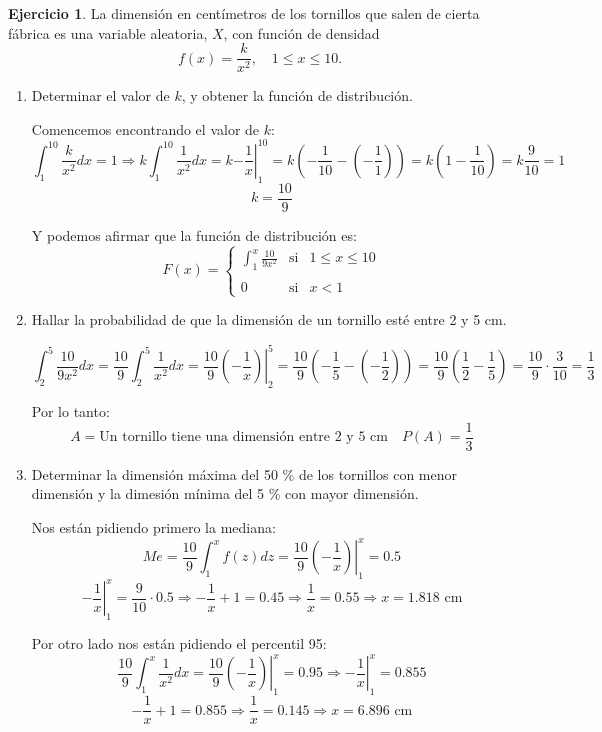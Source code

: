 \documentclass[a4paper, 12pt]{article}
\theoremstyle{definition}
\newtheorem{ej}{Ejercicio}
\begin{document}
\begin{ej}
La dimensión en centímetros de los tornillos que salen de cierta fábrica es una variable aleatoria, \(X\), con función de densidad
\[
	f(x) = \frac{k}{x^2}, \quad 1 \leq x \leq 10.
\]

\begin{enumerate}[label=\alph*)]
	\item Determinar el valor de \(k\), y obtener la función de distribución.
	
Comencemos encontrando el valor de \(k\):
\[
	\int_{1}^{10} \frac{k}{x^2} dx = 1 \Rightarrow k \int_{1}^{10} \frac{1}{x^2} dx = k \left. - \frac{1}{x} \right|_{1}^{10} = k \left(- \frac{1}{10} - \left( - \frac{1}{1} \right) \right) = k \left(1 - \frac{1}{10} \right) = k \frac{9}{10} = 1
\]
\[
	k = \frac{10}{9}
\]

Y podemos afirmar que la función de distribución es:
\[
	F(x) = \left\{ \begin{array}{ccc}
	\int_{1}^{x} \frac{10}{9x^2} & \text{si} & 1 \leq x \leq 10 \\
	\\
	0 & \text{si} & x < 1
	\end{array} \right.
\]

	\item Hallar la probabilidad de que la dimensión de un tornillo esté entre 2 y 5 cm.
	
\[
	\int_{2}^{5} \frac{10}{9x^2}dx = \frac{10}{9}	 \int_{2}^{5} \frac{1}{x^2}dx = \frac{10}{9} \left. \left( - \frac{1}{x} \right) \right|_{2}^{5} = \frac{10}{9} \left( - \frac{1}{5} - \left( - \frac{1}{2} \right) \right) = \frac{10}{9} \left( \frac{1}{2} - \frac{1}{5} \right) = \frac{10}{9} \cdot \frac{3}{10} = \frac{1}{3}
\]

Por lo tanto:
\[
	A = \text{Un tornillo tiene una dimensión entre 2 y 5 cm} \quad P(A) = \frac{1}{3}
\]

	\item Determinar la dimensión máxima del 50 \% de los tornillos con menor dimensión y la dimesión mínima del 5 \% con mayor dimensión.
	
Nos están pidiendo primero la mediana:
\[
	Me = \frac{10}{9} \int_{1}^{x} f(z)dz = \frac{10}{9} \left. \left( - \frac{1}{x} \right) \right|_{1}^{x} = 0.5
\]
\[
	\left. - \frac{1}{x} \right|_{1}^{x} = \frac{9}{10} \cdot 0.5 \Rightarrow  - \frac{1}{x} +1 = 0.45 \Rightarrow \frac{1}{x} = 0.55 \Rightarrow x= 1.818 \text{ cm}
\]

Por otro lado nos están pidiendo el percentil 95:
\[
	\frac{10}{9} \int_{1}^{x} \frac{1}{x^2}dx = \frac{10}{9} \left. \left( - \frac{1}{x} \right) \right|_{1}^{x} = 0.95 \Rightarrow \left. - \frac{1}{x} \right|_{1}^{x} = 0.855
\]
\[
	- \frac{1}{x} + 1 = 0.855 \Rightarrow \frac{1}{x} = 0.145 \Rightarrow x= 6.896 \text{ cm}
\]


\end{enumerate}
\end{ej}
\end{document}
